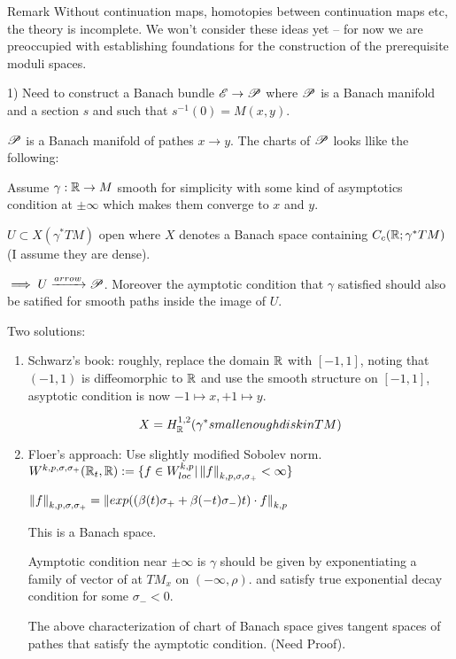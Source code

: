 \documentclass{amsart}
\begin{document}
\begin{clear}{Remark}
Without continuation maps, homotopies between continuation maps etc,
the theory is incomplete. We won't consider these ideas yet -- for now
we are preoccupied with establishing foundations for the construction
of the prerequisite moduli spaces.
\end{clear}

1) Need to construct a Banach bundle $\E\to\P$ where $\P$ is a Banach manifold and a section $s$ and such that $s^{-1}(0)=M(x,y)$.

$\P$ is a Banach manifold of pathes $x\to y$. The charts of $\P$ looks llike the following:

Assume $\gamma:\R\to  M$ smooth for simplicity with some kind of asymptotics condition at $\pm\infty$ which makes them converge to $x$ and $y$.

$U\subset X(\gamma^*TM)$ open where $X$ denotes a Banach space containing $C_c(\R;\gamma^*TM)$ (I assume they are dense).

$\implies U\xrightarrow{arrow}\P$. Moreover the aymptotic condition that $\gamma$ satisfied should also be satified for smooth paths inside the image of $U$.

Two solutions:

\begin{enumerate}

\item Schwarz's book: roughly, replace the domain $\R$ with $[-1,1]$, noting that $(-1,1)$ is diffeomorphic to $\R$ and use the smooth structure on $[-1,1]$, asyptotic condition is now $-1\mapsto x, +1\mapsto y$.

\[
X=H_\R^{1,2}(\gamma^* small enough disk in TM)
\]


\item Floer's approach: Use slightly modified Sobolev norm.
$W^{k,p,\sigma,\sigma_+}(\R_t,\R):=\{f\in W^{k,p}_{loc}|\norm{f}_{k,p,\sigma,\sigma_+}<\infty\}$

$\norm{f}_{k,p,\sigma,\sigma_+}=\norm{exp((\beta(t)\sigma_++\beta(-t)\sigma_-)t)\cdot f}_{k,p}$

This is a Banach space.

Aymptotic condition near $\pm\infty$ is $\gamma$ should be given by exponentiating a family of vector of at $TM_x$ on $(-\infty, \rho)$. and satisfy true exponential decay condition for some $\sigma_-<0$.

The above characterization of chart of Banach space gives tangent spaces of pathes that satisfy the aymptotic condition. (Need Proof).

\end{enumerate}
\end{document}
